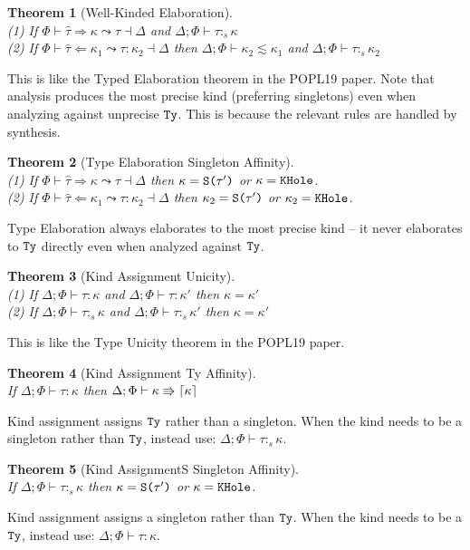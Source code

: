 \documentclass[12pt,letterpaper]{article}
\newcommand{\elabAna}[6]{#1 \vdash #2 \Leftarrow #3 \leadsto #4 : #5 \dashv #6}
\newcommand{\elabSyn}[5]{#1 \vdash #2 \Rightarrow #3 \leadsto #4 \dashv #5}
\newcommand{\kconsubkind}[3]{#1 \vdash #2 \lesssim #3}
\newcommand{\kindAssign}[3]{#1 \vdash #2 : #3}
\newcommand{\kindAssignS}[3]{#1 \vdash #2 :_s #3}
\newcommand{\tauUnrecognize}[3]{#1 \vdash #2 \Rrightarrow \ceil{#3}}
\newcommand{\hPhi}{\Phi}
\newcommand{\htau}{\hat{\tau}}
\newcommand{\hkappa}{\kappa}
\newcommand{\dtau}{\tau}
\newcommand{\Ty}{\textt{Ty}}
\newcommand{\KHole}{\textt{KHole}}
\newcommand{\KSing}[1]{\textt{S(}#1{\textt{)}}}
\begin{document}
\newtheorem{thm}{Theorem}
\begin{thm}[Well-Kinded Elaboration]\ \\
	(1) If $\elabSyn{\hPhi}{\htau}{\hkappa}{\dtau}{\Delta}$ and $\kindAssignS{\Delta;\hPhi}{\dtau}{\hkappa}$ \\
	(2) If $\elabAna{\hPhi}{\htau}{\hkappa_1}{\dtau}{\hkappa_2}{\Delta}$ then $\kconsubkind{\Delta;\hPhi}{\hkappa_2}{\hkappa_1}$ and $\kindAssignS{\Delta;\hPhi}{\dtau}{\hkappa_2}$
\end{thm}
\noindent
This is like the Typed Elaboration theorem in the POPL19 paper. Note that analysis produces the most precise kind (preferring singletons) even when analyzing against unprecise $\Ty$. This is because the relevant rules are handled by synthesis.

\begin{thm}[Type Elaboration Singleton Affinity]\ \\
	(1) If $\elabSyn{\hPhi}{\htau}{\hkappa}{\dtau}{\Delta}$ then $\hkappa = \KSing{\dtau'}$ or $\hkappa = \KHole$. \\
	(2) If $\elabAna{\hPhi}{\htau}{\hkappa_1}{\dtau}{\hkappa_2}{\Delta}$ then $\hkappa_2 = \KSing{\dtau'}$ or $\hkappa_2 = \KHole$.
\end{thm}
\noindent
Type Elaboration always elaborates to the most precise kind -- it never elaborates to $\Ty$ directly even when analyzed against $\Ty$.

\begin{thm}[Kind Assignment Unicity]\ \\
	(1) If $\kindAssign{\Delta;\hPhi}{\dtau}{\hkappa}$ and $\kindAssign{\Delta;\hPhi}{\dtau}{\hkappa'}$ then $\hkappa = \hkappa'$ \\
	(2) If $\kindAssignS{\Delta;\hPhi}{\dtau}{\hkappa}$ and $\kindAssignS{\Delta;\hPhi}{\dtau}{\hkappa'}$ then $\hkappa = \hkappa'$
\end{thm}
\noindent
This is like the Type Unicity theorem in the POPL19 paper.

\begin{thm}[Kind Assignment Ty Affinity]\ \\
	If $\kindAssign{\Delta;\hPhi}{\dtau}{\hkappa}$ then $\tauUnrecognize{\Delta;\hPhi}{\hkappa}{\hkappa}$
\end{thm}
\noindent
Kind assignment assigns $\Ty$ rather than a singleton. When the kind needs to be a singleton rather than $\Ty$, instead use: $\kindAssignS{\Delta;\hPhi}{\dtau}{\hkappa}$.

\begin{thm}[Kind AssignmentS Singleton Affinity]\ \\
	If $\kindAssignS{\Delta;\hPhi}{\dtau}{\hkappa}$ then $\hkappa = \KSing{\dtau'}$ or $\hkappa = \KHole$.
\end{thm}
\noindent
Kind assignment assigns a singleton rather than $\Ty$. When the kind needs to be a $\Ty$, instead use: $\kindAssign{\Delta;\hPhi}{\dtau}{\hkappa}$.
\end{document}

